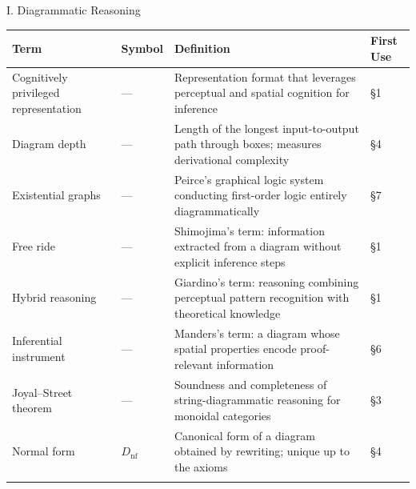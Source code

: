 \documentclass[
  ignorenonframetext,
]{beamer}
\newcounter{none} %
\begin{document}
\begin{frame}{I. Diagrammatic Reasoning}
\protect{}\label{i.-diagrammatic-reasoning}
{\def\LTcaptype{none} %
\begin{longtable}[]{@{}
  >{\raggedright\arraybackslash}p{}
  >{\centering\arraybackslash}p{}
  >{\raggedright\arraybackslash}p{}
  >{\centering\arraybackslash}p{}@{}}
\toprule\noalign{}
\begin{minipage}[b]{\linewidth}\raggedright
Term
\end{minipage} & \begin{minipage}[b]{\linewidth}\centering
Symbol
\end{minipage} & \begin{minipage}[b]{\linewidth}\raggedright
Definition
\end{minipage} & \begin{minipage}[b]{\linewidth}\centering
First Use
\end{minipage} \\
\midrule\noalign{}
\endhead
Cognitively privileged representation & --- & Representation format that
leverages perceptual and spatial cognition for inference & §1 \\
Diagram depth & --- & Length of the longest input-to-output path through
boxes; measures derivational complexity & §4 \\
Existential graphs & --- & Peirce's graphical logic system conducting
first-order logic entirely diagrammatically & §7 \\
Free ride & --- & Shimojima's term: information extracted from a diagram
without explicit inference steps & §1 \\
Hybrid reasoning & --- & Giardino's term: reasoning combining perceptual
pattern recognition with theoretical knowledge & §1 \\
Inferential instrument & --- & Manders's term: a diagram whose spatial
properties encode proof-relevant information & §6 \\
Joyal--Street theorem & --- & Soundness and completeness of
string-diagrammatic reasoning for monoidal categories & §3 \\
Normal form & \(D_{\text{nf}}\) & Canonical form of a diagram obtained
by rewriting; unique up to the axioms & §4 \\
\bottomrule\noalign{}
\end{longtable}
}
\end{frame}
\end{document}
